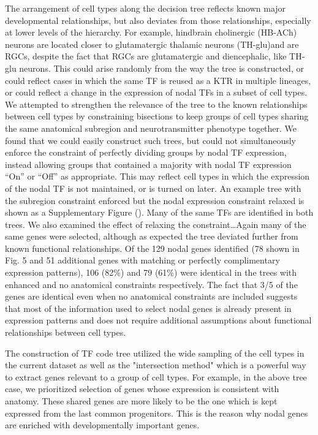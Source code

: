 The arrangement of cell types along the decision tree reflects known major developmental relationships, but also deviates from those relationships, especially at lower levels of the hierarchy. For example, hindbrain cholinergic (HB-ACh) neurons are located closer to glutamatergic thalamic neurons (TH-glu)and are RGCs, despite the fact that RGCs are glutamatergic and diencephalic, like TH-glu neurons. This could arise randomly from the way the tree is constructed, or could reflect cases in which the same TF is reused as a KTR in multiple lineages, or could reflect a change in the expression of nodal TFs in a subset of cell types. We attempted to strengthen the relevance of the tree to the known relationships between cell types by constraining bisections to keep groups of cell types sharing the same anatomical subregion and neurotransmitter phenotype together. We found that we could easily construct such trees, but could not simultaneously enforce the constraint of perfectly dividing groups by nodal TF expression, instead allowing groups that contained a majority with nodal TF expression “On” or “Off” as appropriate. This may reflect cell types in which the expression of the nodal TF is not maintained, or is turned on later. An example tree with the subregion constraint enforced but the nodal expression constraint relaxed is shown as a Supplementary Figure (). Many of the same TFs are identified in both trees. We also examined the effect of relaxing the constraint…Again many of the same genes were selected, although as expected the tree deviated further from known functional relationships. Of the 129 nodal genes identified (78 shown in Fig. 5 and 51 additional genes with matching or perfectly complimentary expression patterns), 106 (82\%) and 79 (61\%) were identical in the trees with enhanced and no anatomical constraints respectively. The fact that 3/5 of the genes are identical even when no anatomical constraints are included suggests that most of the information used to select nodal genes is already present in expression patterns and does not require additional assumptions about functional relationships between cell types.

The construction of TF code tree utilized the wide sampling of the cell types in the current dataset as well as the "intersection method" which is a powerful way to extract genes relevant to a group of cell types. For example, in the above tree case, we prioritized selection of genes whose expression is consistent with anatomy. These shared genes are more likely to be the one which is kept expressed from the last common progenitors. This is the reason why nodal genes are enriched with developmentally important genes.

